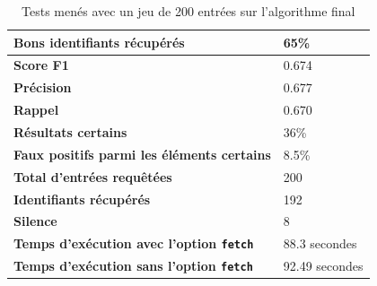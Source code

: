 \begin{table}[h]
	\centering
	\begin{tabular}{m{10cm}m{4cm}}
		\textbf{Bons identifiants récupérés} & 65\% \\
		\hline
		\textbf{Score F1 } & 0.674 \\
		\hline
		\textbf{Précision } & 0.677 \\
		\hline
		\textbf{Rappel } & 0.670 \\
		\hline
		\textbf{Résultats certains } & 36\% \\
		\hline
		\textbf{Faux positifs parmi les éléments certains} & 8.5\% \\
		\hline
		\textbf{Total d'entrées requêtées } & 200 \\
		\hline
		\textbf{Identifiants récupérés } & 192 \\
		\hline
		\textbf{Silence } & 8 \\
		\hline
		\textbf{Temps d'exécution avec l'option \texttt{fetch} } & 88.3 secondes \\
		\hline
		\textbf{Temps d'exécution sans l'option \texttt{fetch}} & 92.49 secondes \\
	\end{tabular}
	\caption{Tests menés avec un jeu de 200 entrées sur l'algorithme final}
	\label{appendix:testfinal}
\end{table}

